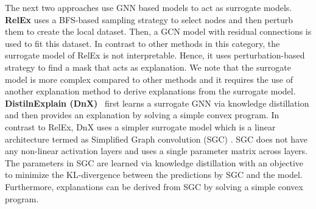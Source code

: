 The next two approaches use GNN based models to act as surrogate models. \textbf{RelEx} \cite{RELex} uses a BFS-based sampling strategy to select nodes and then perturb them to create the local dataset. Then, a GCN model with residual connections is used to fit this dataset. In contrast to other methods in this category, the surrogate model of RelEx is not interpretable. Hence, it uses perturbation-based strategy to find a mask that acts as explanation. We note that the surrogate model is more complex compared to other methods and it requires the use of another explanation method to derive explanations from the surrogate model. \textbf{DistilnExplain (DnX)}~\cite{distilexplain} first learns a surrogate GNN via knowledge distillation and then provides an explanation by solving a simple convex program. In contrast to RelEx, DnX uses a simpler surrogate model which is a linear architecture termed as Simplified Graph convolution (SGC) \cite{Simple-GCN}. SGC does not have any non-linear activation layers and uses a single parameter matrix across layers. The parameters in SGC are learned via knowledge distillation with an objective to minimize the KL-divergence between the predictions by SGC and the model. Furthermore, explanations can be derived from SGC by solving a simple convex program.







